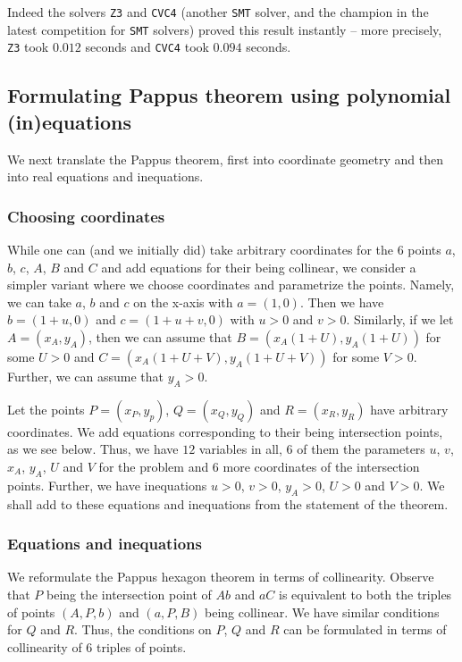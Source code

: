 \documentclass{amsart}
\theoremstyle{plain}
\theoremstyle{definition}
\theoremstyle{remark}
\begin{document}
Indeed the solvers \texttt{Z3} and \texttt{CVC4} (another \texttt{SMT} solver, and the champion in the 
latest competition for \texttt{SMT} solvers) proved this result instantly -- more
precisely, \texttt{Z3} took \(0.012\) seconds and \texttt{CVC4} took \(0.094\) seconds.

\subsection{Formulating Pappus theorem using polynomial (in)equations}

We next translate the Pappus theorem, first into coordinate geometry and then into
real equations and inequations.

\subsubsection{Choosing coordinates}

While one can (and we initially did) take arbitrary coordinates for the
\(6\) points \(a\), \(b\), \(c\), \(A\), \(B\) and \(C\) and add
equations for their being collinear, we consider a simpler variant where
we choose coordinates and parametrize the points. Namely, we can take
\(a\), \(b\) and \(c\) on the x-axis with \(a = (1, 0)\). Then we have
\(b = (1 + u, 0)\) and \(c = (1 + u + v, 0)\) with \(u>0\) and \(v>0\).
Similarly, if we let \(A = (x_A, y_A)\), then we can assume that
\(B = (x_A(1+ U), y_A(1 + U))\) for some \(U > 0\) and
\(C = (x_A(1+ U + V), y_A(1 + U + V))\) for some \(V > 0\). Further, we
can assume that \(y_A > 0\).

Let the points \(P= (x_P, y_p)\), \(Q = (x_Q, y_Q)\) and
\(R= (x_R, y_R)\) have arbitrary coordinates. We add equations
corresponding to their being intersection points, as we see below. Thus,
we have \(12\) variables in all, \(6\) of them the parameters \(u\),
\(v\), \(x_A\), \(y_A\), \(U\) and \(V\) for the problem and \(6\) more
coordinates of the intersection points. Further, we have inequations
\(u >0\), \(v >0\), \(y_A >0\), \(U > 0\) and \(V >0\). We shall add to
these equations and inequations from the statement of the theorem.

\subsubsection{Equations and inequations}

We reformulate the Pappus hexagon theorem in terms of collinearity.
Observe that \(P\) being the intersection point of \(Ab\) and \(aC\) is
equivalent to both the triples of points \((A, P, b)\) and \((a, P, B)\)
being collinear. We have similar conditions for \(Q\) and \(R\). Thus,
the conditions on \(P\), \(Q\) and \(R\) can be formulated in terms of
collinearity of \(6\) triples of points.
\end{document}
